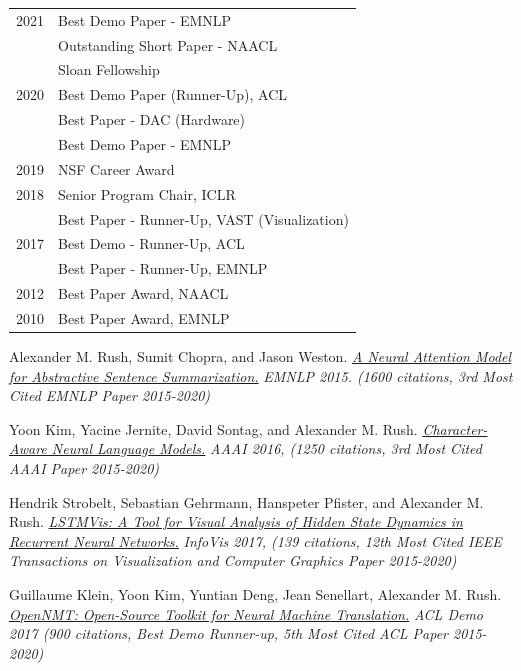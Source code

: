 \documentclass[10pt]{article}
\begin{document}

\hspace{-1cm} \begin{tabular}{lp{11.5cm}}
2021 & Best Demo Paper -  EMNLP \\
     & Outstanding Short Paper -  NAACL \\
     & Sloan Fellowship\\
2020 & Best Demo Paper (Runner-Up), ACL   \\
& Best Paper - DAC (Hardware)  \\
& Best Demo Paper - EMNLP  \\
2019 & NSF Career Award \\
2018 & Senior Program Chair, ICLR  \\
& Best Paper - Runner-Up, VAST (Visualization)  \\
2017 & Best Demo  - Runner-Up, ACL  \\
& Best Paper - Runner-Up, EMNLP \\
2012 & Best Paper Award, NAACL \\
2010 & Best Paper Award, EMNLP \\
\end{tabular}

\medskip
\noindent
{}

\ind Alexander M. Rush, Sumit Chopra, and Jason Weston. \emph{\href{ http://arxiv.org/pdf/1509.00685.pdf }{ A Neural Attention Model for Abstractive Sentence Summarization.} }\emph{ EMNLP 2015. (1600 citations, 3rd Most Cited EMNLP Paper 2015-2020) }



\ind Yoon Kim, Yacine Jernite, David Sontag, and Alexander M. Rush. \emph{\href{ https://arxiv.org/pdf/1508.06615v4 }{ Character-Aware Neural Language Models.} }\emph{ AAAI 2016, (1250 citations, 3rd Most Cited AAAI Paper 2015-2020) }



\ind Hendrik Strobelt, Sebastian Gehrmann, Hanspeter Pfister, and Alexander M. Rush. \emph{\href{ http://lstm.seas.harvard.edu/ }{ LSTMVis: A Tool for Visual Analysis of Hidden State Dynamics in Recurrent Neural Networks.} }\emph{ InfoVis 2017, (139 citations, 12th Most Cited IEEE Transactions on Visualization and Computer Graphics Paper 2015-2020) }

\ind Guillaume Klein, Yoon Kim, Yuntian Deng, Jean Senellart, Alexander M. Rush. \emph{\href{ https://arxiv.org/abs/1701.02810 }{ OpenNMT: Open-Source Toolkit for Neural Machine Translation.} }\emph{ ACL Demo 2017 (900 citations, Best Demo Runner-up, 5th Most Cited ACL Paper 2015-2020) }
\end{document}
